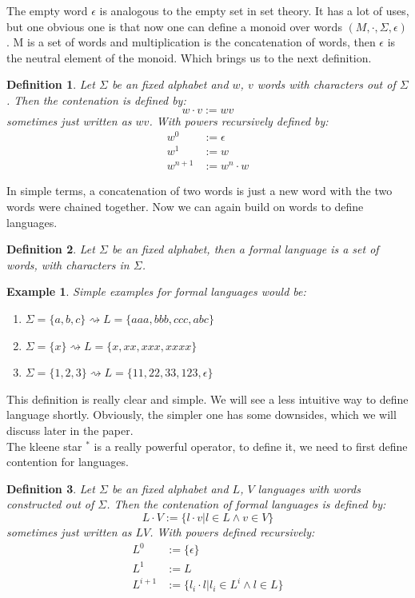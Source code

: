 \documentclass[12pt,letterpaper]{article}
\newtheorem{definition}{Definition}
\newtheorem{example}{Example}[section]
\begin{document}
The empty word $\epsilon$ is analogous to the empty set in set theory.
It has a lot of uses, but one obvious one is that now one can define 
a monoid over words $(M, \cdot, \Sigma, \epsilon)$.
M is a set of words and multiplication is the concatenation of words, then 
$\epsilon$ is the neutral element of the monoid. Which brings us to
the next definition.
\begin{definition}
  Let $\Sigma$ be an fixed alphabet and  $w$, $v$ words with 
  characters out of $\Sigma$. Then the contenation is defined by:
  \[ w \cdot v := wv\]
  sometimes just written as $wv$. With powers recursively defined by:
  \begin{align*}
    w^0 &:= \epsilon\\
    w^1 &:= w\\
    w^{n+1} &:= w^n\cdot w
  \end{align*}
\end{definition}
In simple terms, a concatenation of two words is just a new word with
the two words were chained together. Now we can again build on
words to define languages.
\begin{definition}
  Let $\Sigma$ be an fixed alphabet, then a formal language is a 
  set of words, with characters in $\Sigma$.
\end{definition}
\begin{example}
  Simple examples for formal languages would be:
  \begin{enumerate}
    \item $\Sigma = \{a,b,c\} \rightsquigarrow L = \{aaa, bbb, ccc, abc\}$
    \item $\Sigma = \{x\} \rightsquigarrow L = \{ x, xx, xxx, xxxx\}$
    \item $\Sigma = \{1,2,3\} \rightsquigarrow L = \{11, 22, 33, 123,\epsilon\}$
  \end{enumerate}
\end{example}
This definition is really clear and simple. We will see a less intuitive way to
define language shortly. Obviously, the simpler one has some downsides, 
which we will discuss later in the paper. \\
The kleene star $^*$ is a really powerful operator, to define it, we need
to first define contention for languages.
\pagebreak
\begin{definition}
  Let $\Sigma$ be an fixed alphabet and  $L$, $V$ languages with 
  words constructed out of $\Sigma$.
  Then the contenation of formal languages is defined by:
  \[ L \cdot V := \{ l \cdot v | l \in L \land v \in V \}\]
  sometimes just written as $LV$. With powers defined recursively:
  \begin{align*}
      L^0 & := \{\epsilon \}\\
      L^1 & := L  \\
      L^{i+1} & := \{ l_i\cdot l | l_i \in L^i \land l \in L\}
  \end{align*}
\end{definition}
\end{document}

